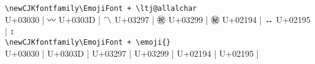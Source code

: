\documentclass{ctexbook}
\begin{document}
\verb!\newCJKfontfamily\EmojiFont + \ltj@allalchar! \\
U+03030 | {\ltj@allalchar\EmojiFont 〰}
U+0303D | {\ltj@allalchar\EmojiFont 〽}
U+03297 | {\ltj@allalchar\EmojiFont ㊗}
U+03299 | {\ltj@allalchar\EmojiFont ㊙}
U+02194 | {\ltj@allalchar\EmojiFont ↔} 
U+02195 | {\ltj@allalchar\EmojiFont ↕} \\

\verb!\newCJKfontfamily\EmojiFont + \emoji{}! \\
U+03030 | 
U+0303D | 
U+03297 | 
U+03299 | 
U+02194 |  
U+02195 |  \\
\end{document}
